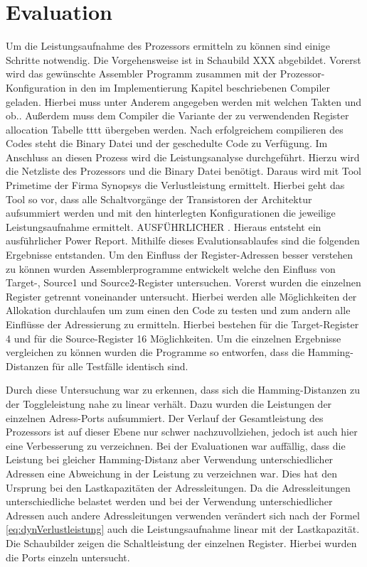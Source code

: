 \chapter{Evaluation}
\label{chap:evaluation}
Um die Leistungsaufnahme des Prozessors ermitteln zu können sind einige Schritte notwendig. Die Vorgehensweise ist in Schaubild XXX abgebildet. 
Vorerst wird das gewünschte Assembler Programm zusammen mit der Prozessor-Konfiguration in den im Implementierung Kapitel beschriebenen Compiler geladen. Hierbei muss unter Anderem angegeben werden mit welchen Takten und ob.. Außerdem muss dem Compiler die Variante der zu verwendenden Register allocation Tabelle tttt übergeben werden. Nach erfolgreichem compilieren des Codes steht die Binary Datei und der geschedulte Code zu Verfügung. Im Anschluss an diesen Prozess wird die Leistungsanalyse durchgeführt. Hierzu wird die Netzliste des Prozessors und die Binary Datei benötigt. Daraus wird mit Tool Primetime der Firma Synopsys die Verlustleistung ermittelt. Hierbei geht das Tool so vor, dass alle Schaltvorgänge der Transistoren der Architektur aufsummiert werden und mit den hinterlegten Konfigurationen die jeweilige Leistungsaufnahme ermittelt. AUSFÜHRLICHER . Hieraus entsteht ein ausführlicher Power Report. 
Mithilfe dieses Evalutionsablaufes sind die folgenden Ergebnisse entstanden.
Um den Einfluss der Register-Adressen besser verstehen zu können wurden Assemblerprogramme entwickelt welche den Einfluss von Target-, Source1 und Source2-Register untersuchen. Vorerst wurden die einzelnen Register getrennt voneinander untersucht. Hierbei werden alle Möglichkeiten der Allokation durchlaufen um zum einen den Code zu testen und zum andern alle Einflüsse der Adressierung zu ermitteln. Hierbei bestehen für die Target-Register 4 und für die Source-Register 16 Möglichkeiten. Um die einzelnen Ergebnisse vergleichen zu können wurden die Programme so entworfen, dass die Hamming-Distanzen für alle Testfälle identisch sind. 

Durch diese Untersuchung war zu erkennen, dass sich die Hamming-Distanzen zu der Toggleleistung nahe zu linear verhält. Dazu wurden die Leistungen der einzelnen Adress-Ports aufsummiert. Der Verlauf der Gesamtleistung des Prozessors ist auf dieser Ebene nur schwer nachzuvollziehen, jedoch ist auch hier eine Verbesserung zu verzeichnen. 
Bei der Evaluationen war auffällig, dass die Leistung bei gleicher Hamming-Distanz aber Verwendung unterschiedlicher Adressen eine Abweichung in der Leistung zu verzeichnen war. Dies hat den Ursprung bei den Lastkapazitäten der Adressleitungen. Da die Adressleitungen unterschiedliche belastet werden und bei der Verwendung unterschiedlicher Adressen auch andere Adressleitungen verwenden verändert sich nach der Formel \ref{eq:dynVerlustleistung} auch die Leistungsaufnahme linear mit der Lastkapazität. 
Die Schaubilder zeigen die Schaltleistung der einzelnen Register. Hierbei wurden die Ports einzeln untersucht. 

